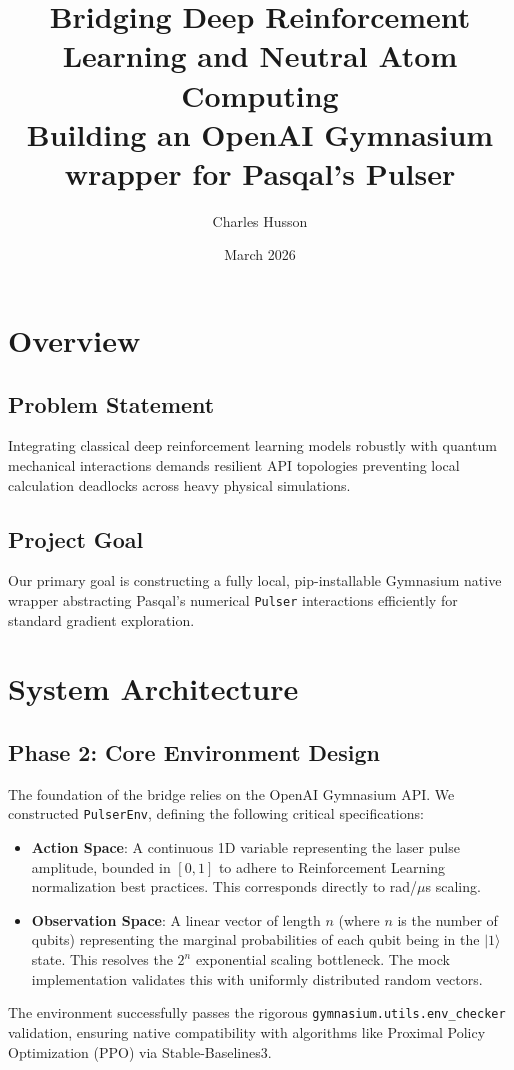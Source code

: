 \documentclass{article}
\title{\textbf{Bridging Deep Reinforcement Learning and Neutral Atom Computing}\\
\large Building an OpenAI Gymnasium wrapper for Pasqal's Pulser}
\author{Charles Husson}
\date{March 2026}
\begin{document}
\maketitle
\thispagestyle{fancy}
\section{Overview}

\subsection{Problem Statement}
Integrating classical deep reinforcement learning models robustly with quantum mechanical interactions demands resilient API topologies preventing local calculation deadlocks across heavy physical simulations.

\subsection{Project Goal}
Our primary goal is constructing a fully local, pip-installable Gymnasium native wrapper abstracting Pasqal's numerical \texttt{Pulser} interactions efficiently for standard gradient exploration.

\section{System Architecture}

\subsection{Phase 2: Core Environment Design}
The foundation of the bridge relies on the OpenAI Gymnasium API. We constructed \texttt{PulserEnv}, defining the following critical specifications:
\begin{itemize}
    \item \textbf{Action Space}: A continuous 1D variable representing the laser pulse amplitude, bounded in $[0, 1]$ to adhere to Reinforcement Learning normalization best practices. This corresponds directly to rad/$\mu$s scaling.
    \item \textbf{Observation Space}: A linear vector of length $n$ (where $n$ is the number of qubits) representing the marginal probabilities of each qubit being in the $|1\rangle$ state. This resolves the $2^n$ exponential scaling bottleneck. The mock implementation validates this with uniformly distributed random vectors.
\end{itemize}
The environment successfully passes the rigorous \texttt{gymnasium.utils.env\_checker} validation, ensuring native compatibility with algorithms like Proximal Policy Optimization (PPO) via Stable-Baselines3.
\end{document}
